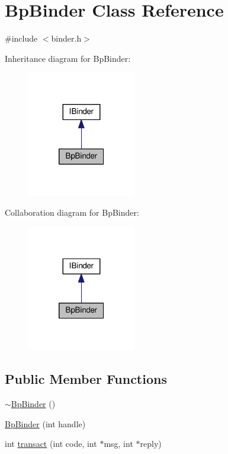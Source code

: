 \hypertarget{classBpBinder}{\section{Bp\-Binder Class Reference}
\label{classBpBinder}
}


{\ttfamily \#include $<$binder.\-h$>$}



Inheritance diagram for Bp\-Binder\-:
\nopagebreak
\begin{figure}[H]
\begin{center}
\leavevmode
\includegraphics[width=134pt]{classBpBinder__inherit__graph}
\end{center}
\end{figure}


Collaboration diagram for Bp\-Binder\-:
\nopagebreak
\begin{figure}[H]
\begin{center}
\leavevmode
\includegraphics[width=134pt]{classBpBinder__coll__graph}
\end{center}
\end{figure}
\subsection*{Public Member Functions}
\begin{DoxyCompactItemize}
\item 
\hyperlink{classBpBinder_a7e773b3a4a5f65b7645c691e9b25c018}{$\sim$\-Bp\-Binder} ()
\item 
\hyperlink{classBpBinder_a5fc7fa443fe73dbf86cdb33c301563d9}{Bp\-Binder} (int handle)
\item 
int \hyperlink{classBpBinder_a55c5d2af946bce92156a921a6a94a23d}{transact} (int code, int $\ast$msg, int $\ast$reply)
\end{DoxyCompactItemize}
